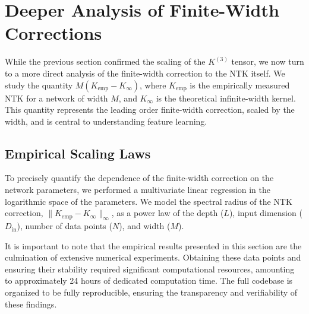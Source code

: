 \documentclass[a4paper]{article}
\begin{document}
\section{Deeper Analysis of Finite-Width Corrections}

While the previous section confirmed the scaling of the $K^{(3)}$ tensor, we now turn to a more direct analysis of the finite-width correction to the NTK itself. We study the quantity $M(K_{\text{emp}} - K_{\infty})$, where $K_{\text{emp}}$ is the empirically measured NTK for a network of width $M$, and $K_{\infty}$ is the theoretical infinite-width kernel. This quantity represents the leading order finite-width correction, scaled by the width, and is central to understanding feature learning.

\subsection{Empirical Scaling Laws}

To precisely quantify the dependence of the finite-width correction on the network parameters, we performed a multivariate linear regression in the logarithmic space of the parameters. We model the spectral radius of the NTK correction, $\|K_{\text{emp}} - K_{\infty}\|_\infty$, as a power law of the depth ($L$), input dimension ($D_{\text{in}}$), number of data points ($N$), and width ($M$).

\begin{remark}
It is important to note that the empirical results presented in this section are the culmination of extensive numerical experiments. Obtaining these data points and ensuring their stability required significant computational resources, amounting to approximately 24 hours of dedicated computation time. The full codebase is organized to be fully reproducible, ensuring the transparency and verifiability of these findings.
\end{remark}
\end{document}
